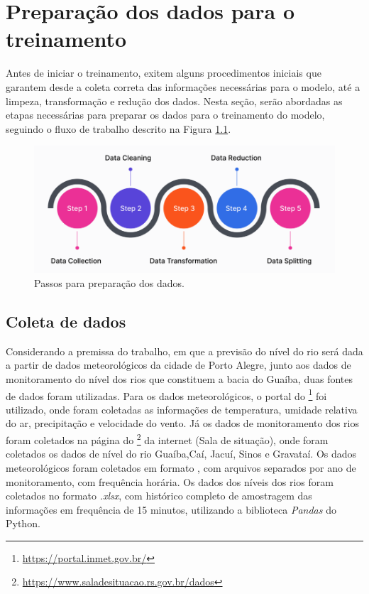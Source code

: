 \chapter{Preparação dos dados para o treinamento}

Antes de iniciar o treinamento, exitem alguns procedimentos iniciais que garantem desde a coleta correta das informações necessárias para o modelo, até a limpeza, transformação e redução dos dados. Nesta seção, serão abordadas as etapas necessárias para preparar os dados para o treinamento do modelo, seguindo o fluxo de trabalho descrito na Figura \ref{fig:passos_preparacao}.

\begin{figure}[H]
	\caption{\label{fig:passos_preparacao}Passos para preparação dos dados.}
	\begin{center}
		\includegraphics[scale=0.4]{figuras/steps_data_preparing.png}
	\end{center}
\end{figure}

\section{Coleta de dados}

Considerando a premissa do trabalho, em que a previsão do nível do rio será dada a partir de dados meteorológicos da cidade de Porto Alegre, junto aos dados de monitoramento do nível dos rios que constituem a bacia do Guaíba, duas fontes de dados foram utilizadas. Para os dados meteorológicos, o portal do \footnote{\url{https://portal.inmet.gov.br/}} foi utilizado, onde foram coletadas as informações de temperatura, umidade relativa do ar, precipitação e velocidade do vento. Já os dados de monitoramento dos rios foram coletados na página do \footnote{\url{https://www.saladesituacao.rs.gov.br/dados}} da internet (Sala de situação), onde foram coletados os dados de nível do rio Guaíba,Caí, Jacuí, Sinos e Gravataí. Os dados meteorológicos foram coletados em formato , com arquivos separados por ano de monitoramento, com frequência horária. Os dados dos níveis dos rios foram coletados no formato \textit{.xlsx}, com histórico completo de amostragem das informações em frequência de 15 minutos, utilizando a biblioteca \textit{Pandas} do Python.

